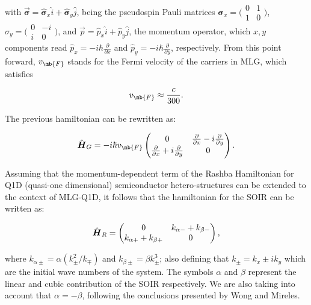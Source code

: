 \documentclass[twocolumn]{revtex4-2}
\newcommand{\bn}[1]{\mbox{\boldmath $#1$}}
\begin{document}
    \noindent with $\vec{\mathbf{\sigma}} = \hat{\mathbf{\sigma}}_{x}\hat{i} + \hat{\mathbf{\sigma}}_{y}\hat{j}$, being the pseudospin Pauli matrices $\hat{\mathbf{\sigma}}_{x} = \bigl(\begin{smallmatrix}0&1 \\ 1&0\end{smallmatrix} \bigr)$, $\hat{\sigma}_{y} = \bigl(\begin{smallmatrix}0&-i \\ i&0\end{smallmatrix} \bigr)$, and $\vec{p}=\hat{p}_{x}\hat{i}+\hat{p}_{y}\hat{j}$, the momentum operator, which $x, y$ components read $\hat{p}_{x} = -i\hbar\frac{\partial}{\partial x}$ and $\hat{p}_{y} = -i\hbar\frac{\partial}{\partial y}$, respectively.
    From this point forward, $v_{\mb{\tiny F}}$ stands for the Fermi velocity of the carriers in MLG, which satisfies

    \begin{equation}
        \label{eq:vF}
        v_{\mb{\tiny F}} \approx \frac{c}{300}.
    \end{equation}

    The previous hamiltonian can be rewritten as:

\begin{equation}
    \label{eq:pristineGrapheneMatrix}
    \hat{\bn{H}}_G = -i\hbar v_{\mb{\tiny F}}
    \begin{pmatrix}
        0 & \frac{\partial}{\partial x}- i\frac{\partial}{\partial y}\\
        \frac{\partial}{\partial x}+ i\frac{\partial}{\partial y} & 0
    \end{pmatrix}.
\end{equation}

    Assuming that the momentum-dependent term of the Rashba Hamiltonian for Q1D (quasi-one dimensional) semiconductor hetero-structures can be extended to the context of MLG-Q1D\cite{RDiago2010, JAP2019}, it follows that the hamiltonian for the SOIR can be written as:

    \begin{equation}
        \label{eq:SOIRHamiltonian}
        \hat{\bn{H}}_R =
        \begin{pmatrix}
            0 & k_{\alpha-} + k_{\beta-}\\
            k_{\alpha+} + k_{\beta+} & 0
        \end{pmatrix},
    \end{equation}

    \noindent where $k_{\alpha\pm} = \alpha\left(k_{\pm}^2/k_{\mp}\right)$ and $k_{\beta\pm} = \beta k_{\pm}^3$; also defining that $k_{\pm}=k_x\pm i k_y$ which are the initial wave numbers of the system.
    The symbols $\alpha$ and $\beta$ represent the linear and cubic contribution of the SOIR respectively.
    We are also taking into account that $\alpha = -\beta$, following the conclusions presented by Wong and Mireles\cite{WongUNAM2005}.
\end{document}
